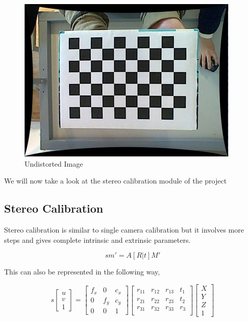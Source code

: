 \documentclass[11pt]{report}
\begin{document}
\begin{figure}
[hp]
\centering
\includegraphics[scale=0.5]{undist.jpg}
\caption[Normal Image]{Undistorted Image}
\end{figure}

We will now take a look at the stereo calibration module of the project
\newpage
\subsection{Stereo Calibration}
Stereo calibration is similar to single camera calibration but it involves more steps and gives complete intrinsic and extrinsic parameters. 

\begin{equation}
sm' = A[R|t]M'
\end{equation}

This can also be represented in the following way,

\begin{equation}
s\begin{bmatrix}
u \\ v \\1
\end{bmatrix}
=\begin{bmatrix}
f_x & 0 & c_x\\
0 & f_y & c_y\\
0 & 0 & 1
\end{bmatrix}
\begin{bmatrix}
r_{11} & r_{12} & r_{13} & t_1\\
r_{21} & r_{22} & r_{23} & t_2\\
r_{31} & r_{32} & r_{33} & r_3\\

\end{bmatrix}
\begin{bmatrix}
X \\ Y \\ Z \\ 1
\end{bmatrix}
\end{equation}
\end{document}
